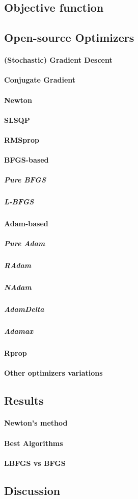 \subsection{Objective function}
\subsection{Open-source Optimizers}
\paragraph{(Stochastic) Gradient Descent}
\paragraph{Conjugate Gradient}
\paragraph{Newton}
\paragraph{SLSQP}
\paragraph{RMSprop}
\paragraph{BFGS-based}
\subparagraph{Pure BFGS}
\subparagraph{L-BFGS}
\paragraph{Adam-based}
\subparagraph{Pure Adam}
\subparagraph{RAdam}
\subparagraph{NAdam}
\subparagraph{AdamDelta}
\subparagraph{Adamax}
\paragraph{Rprop}
\paragraph{Other optimizers variations}

\subsection{Results}
\paragraph{Newton's method}
\paragraph{Best Algorithms}
\paragraph{LBFGS vs BFGS}

\subsection{Discussion}
